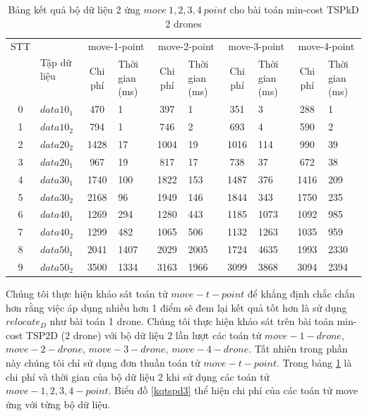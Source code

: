\documentclass[a4paper,12pt]{report}
\begin{document}
\begin{longtable}{|c|l|c|p{1.5cm}|c|p{1cm}|c|p{1cm}|c|p{1cm}|}
\caption{Bảng kết quả bộ dữ liệu 2 ứng $move \ 1, 2, 3, 4 \ point$ cho bài toán min-cost TSPkD 2 drones}
\label{tabletspkd3}\\ 
\toprule
STT&\multirow{2}{*}{Tập dữ liệu} & \multicolumn{2}{c|}{move-1-point } &\multicolumn{2}{c|}{move-2-point } &\multicolumn{2}{c|}{move-3-point }&\multicolumn{2}{c|}{move-4-point } \\
\cline{3-10} 
&&Chi phí &Thời gian (ms)&Chi phí &Thời gian (ms)&Chi phí &Thời gian (ms)&Chi phí &Thời gian (ms)\\
\midrule
        \toprule
0&$data 10_1$&470& 1&
397& 1&
351 &3&
288& 1\\
\hline
1&$data 10_2$&794& 1&
746& 2&
693 &4&
590& 2 \\
\hline
2&$data 20_2$&1428 &17&
1004&  19&
1016& 114&
990& 39 \\
\hline
3&$data 20_1$&967& 19 &
817 &17&
738& 37&
672& 38\\
\hline
4&$data 30_1$&1740 &100&
1822& 153&
1487 &376&
1416& 209 \\
\hline

5&$data 30_2$&2168& 96&
1949& 146&
1844 &343&
1750 &235 \\
\hline
6&$data 40_1$&1269 & 294&
1280& 443&
1185& 1073&
1092& 985 \\
\hline
7&$data 40_2$&1299 & 482&
1065& 506&
1132 &1263&
1035 &959 \\
\hline
8&$data 50_1$&2041 &1407&
2029 &2005 &
1724 &4635 &
1993 & 2330\\
\hline
9&$data 50_2$ & 3500 & 1334 &
3163 & 1966 &
3099 & 3868 &
3094 & 2394\\
\hline

\end{longtable}
\normalsize
Chúng tôi thực hiện khảo sát toán tử $move-t-point$ để khẳng định chắc chắn hơn rằng việc áp dụng nhiều hơn 1 điểm sẽ đem lại kết quả tốt hơn  là sử dụng $relocate_D$ như bài toán 1 drone. Chúng tôi thực hiện khảo sát trên bài toán min-cost TSP2D (2 drone) với bộ dữ liệu 2 lần lượt các toán tử $move-1-drone$, $move-2-drone$, $move-3-drone$, $move-4-drone$. Tất nhiên trong phần này chúng tôi chỉ sử dụng đơn thuần toán tử $move-t-point$.
Trong bảng \ref{tabletspkd3} là chi phí và thời gian của bộ dữ liệu 2 khi sử dụng các toán tử $move- 1, 2, 3, 4 -point$. Biểu đồ \ref{kqtspd3} thể hiện chi phí của các toán tử move ứng với từng bộ dữ liệu. \\
\end{document}
